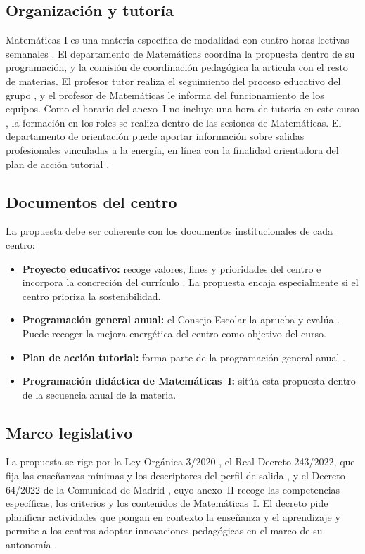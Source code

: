 \subsection{Organización y tutoría}
Matemáticas I es una materia específica de modalidad con cuatro horas lectivas semanales \parencite[anexo~I, p.~32]{decreto64}. El departamento de Matemáticas coordina la propuesta dentro de su programación, y la comisión de coordinación pedagógica la articula con el resto de materias. El profesor tutor realiza el seguimiento del proceso educativo del grupo \parencite[art.~5.1, p.~17]{decreto64}, y el profesor de Matemáticas le informa del funcionamiento de los equipos. Como el horario del anexo~I no incluye una hora de tutoría en este curso \parencite[p.~32]{decreto64}, la formación en los roles se realiza dentro de las sesiones de Matemáticas. El departamento de orientación puede aportar información sobre salidas profesionales vinculadas a la energía, en línea con la finalidad orientadora del plan de acción tutorial \parencite[art.~5.3, p.~17]{decreto64}.

\subsection{Documentos del centro}
La propuesta debe ser coherente con los documentos institucionales de cada centro:
\begin{itemize}
  \item \textbf{Proyecto educativo:} recoge valores, fines y prioridades del centro e incorpora la concreción del currículo \parencite[art.~121.1, p.~122921]{lomloe}. La propuesta encaja especialmente si el centro prioriza la sostenibilidad.
  \item \textbf{Programación general anual:} el Consejo Escolar la aprueba y evalúa \parencite[art.~127.b, p.~122923]{lomloe}. Puede recoger la mejora energética del centro como objetivo del curso.
  \item \textbf{Plan de acción tutorial:} forma parte de la programación general anual \parencite[art.~5.3, p.~17]{decreto64}.
  \item \textbf{Programación didáctica de Matemáticas~I:} sitúa esta propuesta dentro de la secuencia anual de la materia.
\end{itemize}

\subsection{Marco legislativo}
La propuesta se rige por la Ley Orgánica 3/2020 \parencite{lomloe}, el Real Decreto 243/2022, que fija las enseñanzas mínimas y los descriptores del perfil de salida \parencite{rd243}, y el Decreto 64/2022 de la Comunidad de Madrid \parencite{decreto64}, cuyo anexo~II recoge las competencias específicas, los criterios y los contenidos de Matemáticas~I. El decreto pide planificar actividades que pongan en contexto la enseñanza y el aprendizaje \parencite[art.~16.3, p.~21]{decreto64} y permite a los centros adoptar innovaciones pedagógicas en el marco de su autonomía \parencite[art.~19.3.a, pp.~21--22]{decreto64}.

